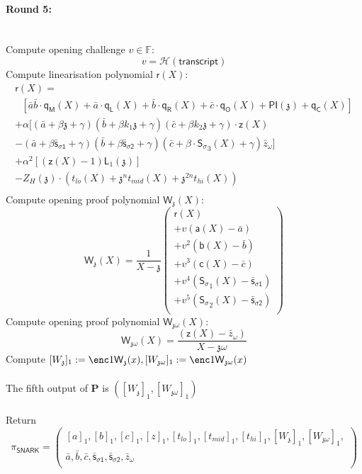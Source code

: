 \documentclass[11pt]{article} %
\newcommand{\F}{\ensuremath{\mathbb F}\xspace}
\newcommand{\chalpoint}{\ensuremath{\mathfrak{z}}\xspace}
\newcommand{\hash}{\ensuremath{\mathcal{H}}\xspace}
\newcommand{\prv}{\ensuremath{\mathsf{\mathbf{P}}}\xspace}
\newcommand{\sigpoly}{\ensuremath{\mathsf{S_{\sigma}}}\xspace}
\newcommand{\sigpolyevala}{\ensuremath{\mathsf{\bar{s}_{\sigma1}}}\xspace}
\newcommand{\sigpolyevalb}{\ensuremath{\mathsf{\bar{s}_{\sigma2}}}\xspace}
\newcommand{\pubinppoly}{\ensuremath{\mathsf{PI}}\xspace}
\newcommand{\lpoly}{\ensuremath{\mathsf{a}}\xspace}
\newcommand{\rpoly}{\ensuremath{\mathsf{b}}\xspace}
\newcommand{\opoly}{\ensuremath{\mathsf{c}}\xspace}
\newcommand{\idpermpoly}{\ensuremath{\mathsf{z}}\xspace}
\newcommand{\lagrangepoly}{\ensuremath{\mathsf{L}}\xspace}
\newcommand{\snark}{\ensuremath{\mathsf{snark}}\xspace}
\newcommand{\Prove}{\mathcal{P}}
\newcommand{\Psnark}{\prv}%
\newcommand{\transcript}{\ensuremath{\mathsf{transcript}}\xspace}
\begin{document}
	\paragraph{\textbf{Round 5:}}\ \\
	Compute opening challenge $v \in \F:$
	$$
	v = \hash(\transcript)
	$$
	Compute linearisation polynomial $\mathsf{r}(X):$
	$$
	\begin{array}{l}
	\mathsf{r}(X) = \\
	\ \ \ \left[ \bar{a} \bar{b} \cdot \mathsf{q_M}(X) + \bar{a} \cdot \mathsf{q_L}(X) + \bar{b} \cdot \mathsf{q_R}(X) + \bar{c} \cdot \mathsf{q_O}(X) + \pubinppoly(\chalpoint) + \mathsf{q_C}(X) \right] \\
	+ \alpha [ (\bar{a} + \beta \chalpoint + \gamma)(\bar{b} + \beta k_1 \chalpoint + \gamma)(\bar{c} + \beta k_2 \chalpoint + \gamma) \cdot \idpermpoly(X)\\ 
	- (\bar{a} + \beta \sigpolyevala + \gamma)(\bar{b} + \beta \sigpolyevalb + \gamma)(\bar{c} + \beta \cdot \sigpoly_3(X)+\gamma )\bar{z}_\omega ] \\
	+ \alpha^2 \left[( \idpermpoly(X) -1 ) \lagrangepoly_1(\chalpoint)\right] \\
	- Z_H(\chalpoint)\cdot(t_{lo}(X)+ \chalpoint ^n t_{mid}(X) + \chalpoint^{2n} t_{hi}(X))\\
	\end{array}
	$$
	Compute opening proof polynomial $\mathsf{W_\chalpoint}(X):$
	$$
	\mathsf{W_\chalpoint}(X) = \frac{1}{X - \chalpoint} \left(
	\begin{array}{l}
	\mathsf{r}(X)  \\
	+ v(\lpoly(X) - \bar{a}) \\
	+ v^2(\rpoly(X) - \bar{b}) \\
	+ v^3(\opoly(X) - \bar{c}) \\
	+ v^4(\sigpoly_1(X) - \sigpolyevala) \\
	+ v^5(\sigpoly_2(X) - \sigpolyevalb) \\
	\end{array}
	\right)
	$$
	Compute opening proof polynomial $\mathsf{W_{\chalpoint\omega}}(X):$
	$$
	\mathsf{W_{\chalpoint \omega}}(X) = \frac{(\idpermpoly(X) - \bar{z}_\omega)}{X - \chalpoint \omega}
	$$
	Compute $[W_\chalpoint]_1 := \enc1{\mathsf{W_\chalpoint}(x)}, [W_{\chalpoint \omega}]_1 := \enc1{\mathsf{W_{\chalpoint \omega}}(x)}$ \\ \\

	The fifth output of $\Psnark$ is $([W_\chalpoint]_1, [W_{\chalpoint\omega}]_1)$
	\\ \\
	Return
	$$
	\pi_{\mathsf{SNARK}} = \left(
	\begin{array}{c}
	[a]_1, [b]_1, [c]_1, [z]_1, [t_{lo}]_1, [t_{mid}]_1, [t_{hi}]_1, [W_\chalpoint]_1, [W_{\chalpoint \omega}]_1, \\
	\bar{a}, \bar{b}, \bar{c}, \sigpolyevala, \sigpolyevalb,  \bar{z}_\omega \\
	\end{array}
	\right)
	$$
	
\end{document}
